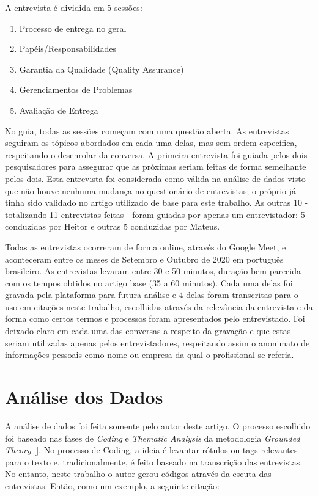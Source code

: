 A entrevista é dividida em 5 sessões: 

\begin{enumerate}
\item Processo de entrega no geral
\item Papéis/Responsabilidades
\item Garantia da Qualidade (Quality Assurance)
\item Gerenciamentos de Problemas
\item Avaliação de Entrega
\end{enumerate}

No guia, todas as sessões começam com uma questão aberta. As entrevistas seguiram os tópicos abordados em cada uma delas, mas sem ordem específica, respeitando o desenrolar da conversa. A primeira entrevista foi guiada pelos dois pesquisadores para assegurar que as próximas seriam feitas de forma semelhante pelos dois. Esta entrevista foi considerada como válida na análise de dados visto que não houve nenhuma mudança no questionário de entrevistas; o próprio já tinha sido validado no artigo utilizado de base para este trabalho. As outras 10 - totalizando 11 entrevistas feitas - foram guiadas por apenas um entrevistador: 5 conduzidas por Heitor e outras 5 conduzidas por Mateus.


Todas as entrevistas ocorreram de forma online, através do Google Meet, e aconteceram entre os meses de Setembro e Outubro de 2020 em português brasileiro. As entrevistas levaram entre 30 e 50 minutos, duração bem parecida com os tempos obtidos no artigo base (35 a 60 minutos). Cada uma delas foi gravada pela plataforma para futura análise e 4 delas foram transcritas para o uso em citações neste trabalho, escolhidas através da relevância da entrevista e da forma como certos termos e processos foram apresentados pelo entrevistado. Foi deixado claro em cada uma das conversas a respeito da gravação e que estas seriam utilizadas apenas pelos entrevistadores, respeitando assim o anonimato de informações pessoais como nome ou empresa da qual o profissional se referia.

\section{Análise dos Dados}


A análise de dados foi feita somente pelo autor deste artigo. O processo escolhido foi baseado nas fases de \emph{Coding} e \emph{Thematic Analysis} da metodologia \emph{Grounded Theory} []. No processo de Coding, a ideia é levantar rótulos ou tags relevantes para o texto e, tradicionalmente, é feito baseado na transcrição das entrevistas. No entanto, neste trabalho o autor gerou códigos através da escuta das entrevistas. Então, como um exemplo, a seguinte citação:

